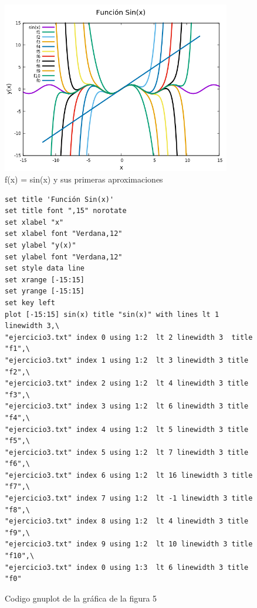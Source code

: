 \documentclass[12pt,a4paper,twoside]{article}
\begin{document}
\begin{figure}[h]
\centering
\includegraphics[width=10cm]{Ejercicio3.png} 
\caption{f(x) = sin(x) y sus primeras aproximaciones}
\label{fig:figura5}
\end{figure}

\begin{figure}[h]
\begin{verbatim}
set title 'Función Sin(x)'
set title font ",15" norotate
set xlabel "x"
set xlabel font "Verdana,12"
set ylabel "y(x)"
set ylabel font "Verdana,12"
set style data line
set xrange [-15:15]
set yrange [-15:15]
set key left
plot [-15:15] sin(x) title "sin(x)" with lines lt 1 linewidth 3,\
"ejercicio3.txt" index 0 using 1:2  lt 2 linewidth 3  title "f1",\
"ejercicio3.txt" index 1 using 1:2  lt 3 linewidth 3 title "f2",\
"ejercicio3.txt" index 2 using 1:2  lt 4 linewidth 3 title "f3",\
"ejercicio3.txt" index 3 using 1:2  lt 6 linewidth 3 title "f4",\
"ejercicio3.txt" index 4 using 1:2  lt 5 linewidth 3 title "f5",\
"ejercicio3.txt" index 5 using 1:2  lt 7 linewidth 3 title "f6",\
"ejercicio3.txt" index 6 using 1:2  lt 16 linewidth 3 title "f7",\
"ejercicio3.txt" index 7 using 1:2  lt -1 linewidth 3 title "f8",\
"ejercicio3.txt" index 8 using 1:2  lt 4 linewidth 3 title "f9",\
"ejercicio3.txt" index 9 using 1:2  lt 10 linewidth 3 title "f10",\
"ejercicio3.txt" index 0 using 1:3  lt 6 linewidth 3 title "f0"
\end{verbatim}
\caption{Codigo gnuplot de la gráfica de la figura 5}
\label{fig:figura6}
\end{figure}
\end{document}
